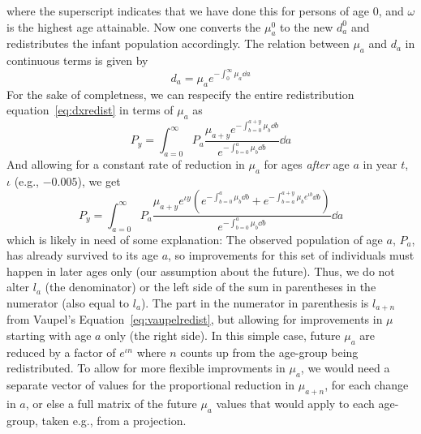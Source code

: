 where the superscript indicates that we have done this for persons of age 0, and
$\omega$ is the highest age attainable. Now one converts the $\mu _a^0$ to the
new $d_a^0$ and redistributes the infant population accordingly. The relation
between $\mu_a$ and $d_a$ in continuous terms is given by
\begin{equation}
d_a = \mu_a e^{-\int_0^\infty \mu_a \dd a}
\end{equation}
For the sake of completness, we can respecify the entire redistribution
equation~\eqref{eq:dxredist} in terms of $\mu_a$ as
\begin{equation}
P_y = \int _{a=0}^\infty P_a \frac{\mu_{a+y} e^{-\int_{b=0}^{a+y} \mu_b \dd
b}}{e^{-\int_{b=0}^a \mu_b \dd b}} \dd a
\end{equation}
And allowing for a constant rate of reduction in $\mu_a$ for ages \textit{after}
age $a$ in year $t$, $\iota$ (e.g., $-0.005$), we get
\begin{equation}
P_y = \int_{a=0}^\infty P_a \frac{\mu_{a+y}e^{\iota y} (e^{-\int_{b=0}^a\mu_b
\dd b}+e^{-\int_{b=a}^{a+y} \mu_b e^{\iota b} \dd b})}{e^{-\int_{b=0}^a \mu_b
\dd b}} \dd a
\end{equation}
which is likely in need of some explanation: The observed population of age $a$,
$P_a$, has already survived to its age $a$, so improvements for this set of
individuals must happen in later ages only (our assumption about the future).
Thus, we do not alter $l_a$ (the denominator) or the left side of the sum in
parentheses in the numerator (also equal to $l_a$). The part in the numerator in
parenthesis is $l_{a+n}$ from Vaupel's Equation~\eqref{eq:vaupelredist}, but allowing
for improvements in $\mu$ starting with age $a$ only (the right side). In this
simple case, future $\mu_a$ are reduced by a factor of $e^{\iota n}$ where 
$n$ counts up from the age-group being redistributed. To allow for more flexible
improvments in $\mu_a$, we would need a separate vector of values for the
proportional reduction in $\mu_{a+n}$, for each change in $a$, or else a full
matrix of the future $\mu_a$ values that would apply to each age-group, taken
e.g., from a projection.

